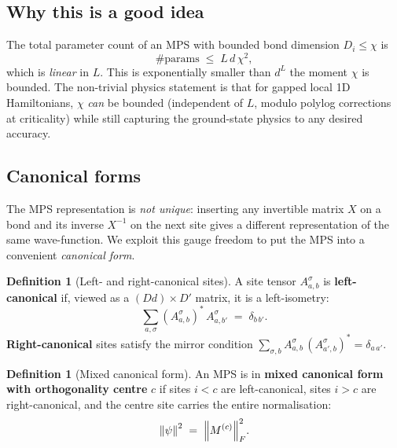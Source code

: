 \documentclass[11pt,a4paper]{article}
\theoremstyle{plain}
\theoremstyle{definition}
\newtheorem{definition}[theorem]{Definition}
\theoremstyle{remark}
\newcommand{\dphys}{d}
\newcommand{\Dvirt}{D}
\begin{document}
\subsection{Why this is a good idea}

The total parameter count of an MPS with bounded bond dimension
$\Dvirt_i \le \chi$ is
\begin{equation}
  \#\text{params} \;\le\; L\,\dphys\,\chi^2,
\end{equation}
which is \emph{linear} in $L$.  This is exponentially smaller than $\dphys^L$
the moment $\chi$ is bounded.  The non-trivial physics statement is that for
gapped local 1D Hamiltonians, $\chi$ \emph{can} be bounded (independent of
$L$, modulo polylog corrections at criticality) while still capturing the
ground-state physics to any desired accuracy.

\subsection{Canonical forms}
\label{sec:canonical}

The MPS representation is \emph{not unique}: inserting any invertible matrix
$X$ on a bond and its inverse $X^{-1}$ on the next site gives a different
representation of the same wave-function.  We exploit this gauge freedom to
put the MPS into a convenient \emph{canonical form}.

\begin{definition}[Left- and right-canonical sites]
A site tensor $A^{\sigma}_{a,b}$ is \textbf{left-canonical} if, viewed as a
$(\Dvirt\dphys) \times \Dvirt'$ matrix, it is a left-isometry:
\begin{equation}
  \sum_{a,\sigma} (A^{\sigma}_{a,b})^{*}\,A^{\sigma}_{a,b'}
  \;=\; \delta_{b\,b'}.
\end{equation}
\textbf{Right-canonical} sites satisfy the mirror condition $\sum_{\sigma,b}
A^{\sigma}_{a,b}\,(A^{\sigma}_{a',b})^{*} = \delta_{a\,a'}$.
\end{definition}

\begin{definition}[Mixed canonical form]
An MPS is in \textbf{mixed canonical form with orthogonality centre} $c$ if
sites $i<c$ are left-canonical, sites $i>c$ are right-canonical, and the
centre site carries the entire normalisation:
\begin{equation}
  \norm{\psi}^2 \;=\; \norm{M^{(c)}}_{F}^{2}.
\end{equation}
\end{definition}
\end{document}
